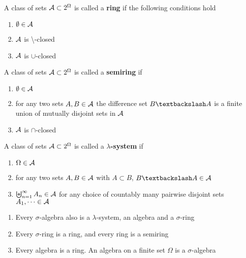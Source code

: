 \documentclass[11pt]{article}
\begin{document}
\begin{definition}[]
A class of sets \(\mathcal{A}\subset2^\Omega\) is called a \textbf{ring} if the following
conditions hold
\begin{enumerate}
\item \(\emptyset\in\mathcal{A}\)
\item \(\mathcal{A}\) is \textbackslash-closed
\item \(\mathcal{A}\) is \(\cup\)-closed
\end{enumerate}
\end{definition}


\begin{definition}[]
A class of sets \(\mathcal{A}\subset2^\Omega\) is called a \textbf{semiring} if
\begin{enumerate}
\item \(\emptyset\in\mathcal{A}\)
\item for any two sets \(A,B\in\mathcal{A}\) the difference set \(B\textbackslash A\) is a
finite union of mutually disjoint sets in \(\mathcal{A}\)
\item \(\mathcal{A}\) is \(\cap\)-closed
\end{enumerate}
\end{definition}

\begin{definition}[]
A class of sets \(\mathcal{A}\subset2^\Omega\) is called a \textbf{\(\lambda\)-system} if
\begin{enumerate}
\item \(\Omega\in\mathcal{A}\)
\item for any two sets \(A,B\in\mathcal{A}\) with \(A\subset B\), \(B\textbackslash A\in\cala\)
\item \(\biguplus_{n=1}^\infty A_n\in\mathcal{A}\) for any choice of countably many
pairwise disjoint sets \(A_1,\dots\in\mathcal{A}\)
\end{enumerate}
\end{definition}

\begin{theorem}[]
\begin{enumerate}
\item Every \(\sigma\)-algebra also is a \(\lambda\)-system, an algebra and a
\(\sigma\)-ring
\item Every \(\sigma\)-ring is a ring, and every ring is a semiring
\item Every algebra is a ring. An algebra on a finite set \(\Omega\) is a \(\sigma\)-algebra
\end{enumerate}
\end{theorem}
\end{document}
